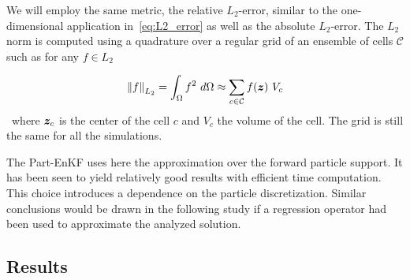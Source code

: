 We will employ the same metric, the relative \(L_2\)-error, similar to the one-dimensional application in~\ref{eq:L2_error} as well as the absolute \(L_2\)-error. The $L_2$ norm is computed using a quadrature over a regular grid of an ensemble of cells $\mathcal{C}$ such as for any $f \in L_2$

$$
	\left\lVert f \right\rVert_{L_2}  = \int_{\Omega} f^2~d\Omega \approx \sum_{c \in \mathcal{C}} f(\bm{z})~V_c
$$~where $\bm{z}_c$ is the center of the cell $c$ and $V_c$ the volume of the cell. The grid is still the same for all the simulations.

The Part-EnKF uses here the approximation over the forward particle support. It has been seen to yield relatively good results with efficient time computation. This choice introduces a dependence on the particle discretization. Similar conclusions would be drawn in the following study if a regression operator had been used to approximate the analyzed solution.

\newpage

\subsection{Results}

